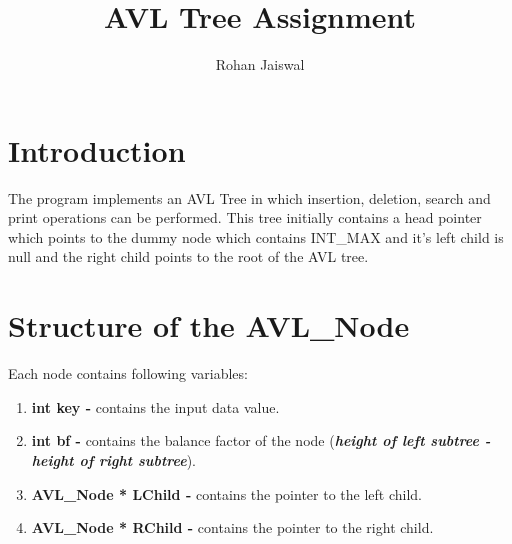 \documentclass[12pt]{article}
\title{AVL Tree Assignment}
\author{Rohan Jaiswal}
\affil{M.Tech CSE 214101042}
\date{}
\begin{document}
\newpage
{}
\maketitle

\section{Introduction}
The program implements an AVL Tree in which insertion, deletion, search and print operations can be performed. This tree initially contains a head pointer which points to the dummy node which contains INT\_MAX and it’s left child is null and the right child points to the root of the AVL tree. 
\section{Structure of the AVL\_Node}
Each node contains following variables:
\begin{enumerate} [label=\roman*]
    \item \textbf{int key - }contains the input data value.
    \item \textbf{int bf - }contains the balance factor of the node (\textbf{\textit{height of left subtree - height of right subtree}}).
     \item \textbf{AVL\_Node * LChild - } contains the pointer to the left child.
     \item \textbf{AVL\_Node * RChild - } contains the pointer to the right child.
\end{enumerate}
\end{document}
